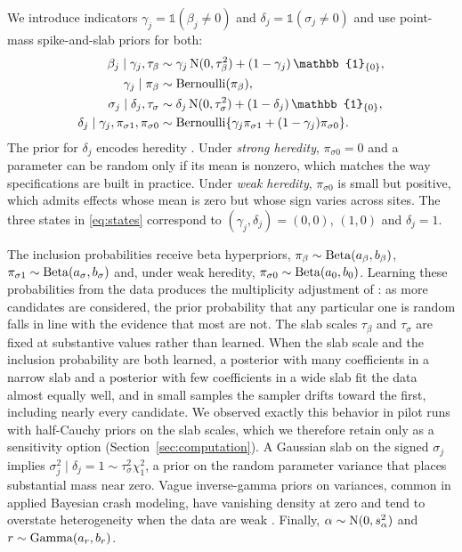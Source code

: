 We introduce indicators $\gamma_j=\mathbb{1}(\beta_j\neq0)$ and $\delta_j=\mathbb{1}(\sigma_j\neq0)$ and use point-mass spike-and-slab priors for both:
\begin{align}
\beta_j\mid\gamma_j,\tau_\beta &\sim \gamma_j\,\Normal(0,\tau_\beta^2)+(1-\gamma_j)\,\mathbb{1}_{\{0\}}, \label{eq:prior-beta}\\
\gamma_j\mid\pi_\beta &\sim \Bern(\pi_\beta), \nonumber\\
\sigma_j\mid\delta_j,\tau_\sigma &\sim \delta_j\,\Normal(0,\tau_\sigma^2)+(1-\delta_j)\,\mathbb{1}_{\{0\}}, \label{eq:prior-sigma}\\
\delta_j\mid\gamma_j,\pi_{\sigma1},\pi_{\sigma0} &\sim \Bern\{\gamma_j\pi_{\sigma1}+(1-\gamma_j)\pi_{\sigma0}\}. \nonumber
\end{align}
The prior for $\delta_j$ encodes heredity \citep{chipman1996bayesian}. Under \emph{strong heredity}, $\pi_{\sigma0}=0$ and a parameter can be random only if its mean is nonzero, which matches the way specifications are built in practice. Under \emph{weak heredity}, $\pi_{\sigma0}$ is small but positive, which admits effects whose mean is zero but whose sign varies across sites. The three states in \eqref{eq:states} correspond to $(\gamma_j,\delta_j)=(0,0)$, $(1,0)$ and $\delta_j=1$.

The inclusion probabilities receive beta hyperpriors, $\pi_\beta\sim\mathrm{Beta}(a_\beta,b_\beta)$, $\pi_{\sigma1}\sim\mathrm{Beta}(a_\sigma,b_\sigma)$ and, under weak heredity, $\pi_{\sigma0}\sim\mathrm{Beta}(a_0,b_0)$. Learning these probabilities from the data produces the multiplicity adjustment of \citet{scott2010bayes}: as more candidates are considered, the prior probability that any particular one is random falls in line with the evidence that most are not. The slab scales $\tau_\beta$ and $\tau_\sigma$ are fixed at substantive values rather than learned. When the slab scale and the inclusion probability are both learned, a posterior with many coefficients in a narrow slab and a posterior with few coefficients in a wide slab fit the data almost equally well, and in small samples the sampler drifts toward the first, including nearly every candidate. We observed exactly this behavior in pilot runs with half-Cauchy priors on the slab scales, which we therefore retain only as a sensitivity option (Section~\ref{sec:computation}). A Gaussian slab on the signed $\sigma_j$ implies $\sigma_j^2\mid\delta_j=1\sim\tau_\sigma^2\chi^2_1$, a prior on the random parameter variance that places substantial mass near zero. Vague inverse-gamma priors on variances, common in applied Bayesian crash modeling, have vanishing density at zero and tend to overstate heterogeneity when the data are weak \citep{gelman2006prior}. Finally, $\alpha\sim\mathrm{N}(0,s_\alpha^2)$ and $r\sim\mathrm{Gamma}(a_r,b_r)$.

